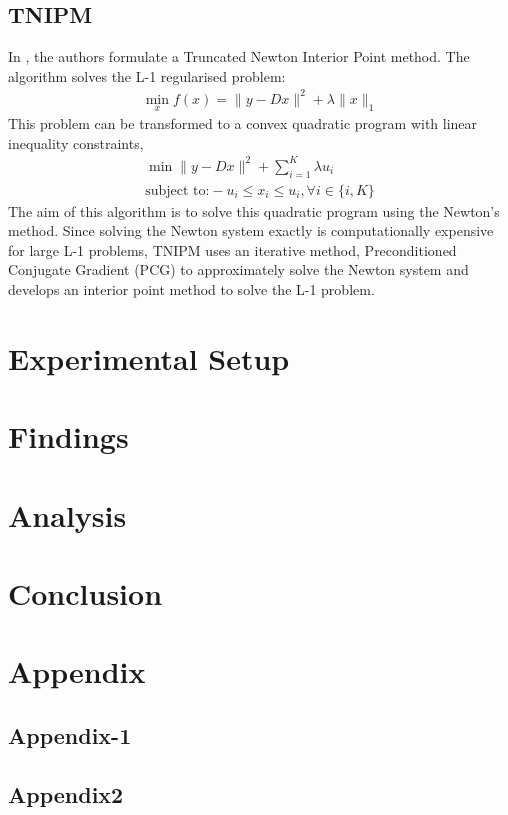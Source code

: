 \documentclass{article} %
\begin{document}
\subsection{TNIPM}
In \cite{l1lskim2007efficient}, the authors formulate a Truncated Newton Interior Point method. The algorithm solves the L-1 regularised problem:
\begin{align}
\min_x f(x) = \|y - Dx\|^2 + \lambda\|x\|_1
\end{align}
This problem can be transformed to a convex quadratic program with linear inequality constraints,
\begin{align}
\min \|y - Dx\|^2 + \sum_{i= 1}^{K}\lambda u_i	\\
\text{subject to:} -u_i \leq x_i \leq u_i, \forall i \in \{i,K\}
\end{align}
The aim of this algorithm is to solve this quadratic program using the Newton's method. Since solving the Newton system exactly is computationally expensive for large L-1 problems, TNIPM uses an iterative method, Preconditioned Conjugate Gradient (PCG) to approximately solve the Newton system and develops an interior point method to solve the L-1 problem. 

\section{Experimental Setup}

\section{Findings}

\section{Analysis}

\section{Conclusion}


\nocite{*}



\newpage
\section{Appendix}


\subsection{Appendix-1}
\label{sec:Appendix1}
 

\subsection{Appendix2}
\label{Appendix2}
\end{document}
